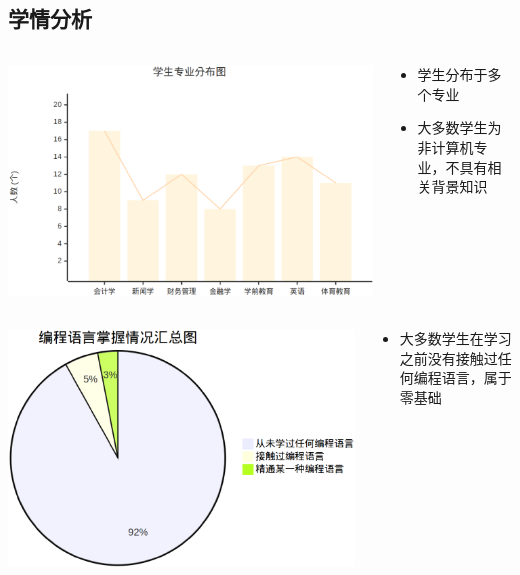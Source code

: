 \documentclass{beamer}
\begin{document}
\subsection{学情分析}


\begin{frame}[t]
	\begin{columns}
		\begin{column}{0.7\textwidth}
			\includegraphics[width=0.8\linewidth]{student_number.eps}
		\end{column}
		\pause
		\begin{column}{0.3\textwidth}
			\begin{itemize}
				\item 学生分布于多个专业
				\item 大多数学生为非计算机专业，不具有相关背景知识
			\end{itemize}
		\end{column}
	\end{columns}
	\pause
	\begin{columns}
		\begin{column}{0.7\textwidth}
			\includegraphics[width=0.7\linewidth]{pie.eps}
		\end{column}
		\pause
		\begin{column}{0.3\textwidth}
			\begin{itemize}
				\item 大多数学生在学习之前没有接触过任何编程语言，属于零基础

			\end{itemize}
		\end{column}
	\end{columns}

\end{frame}
\end{document}
